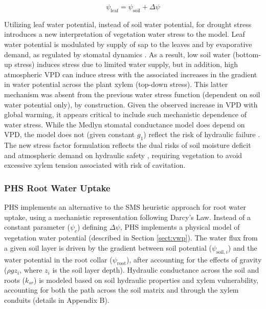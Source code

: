 \documentclass[draft,linenumbers]{agujournal}
\begin{document}
        \begin{linenomath*}
    \begin{equation}
\psi_{\text{leaf}} = \psi_{\text{soil}} + \Delta\psi
    \label{eq:fwphs}
    \end{equation}
    \end{linenomath*}
    
    Utilizing leaf water potential, instead of soil water potential, for drought stress introduces a new interpretation of vegetation water stress to the model. 
    Leaf water potential is modulated by supply of sap to the leaves and by evaporative demand, as regulated by stomatal dynamics \citep{novick2016a}. 
    As a result, low soil water (bottom-up stress) induces stress due to limited water supply, but in addition, high atmospheric VPD can induce stress with the associated increases in the gradient in water potential across the plant xylem (top-down stress). 
    This latter mechanism was absent from the previous water stress function (dependent on soil water potential only), by construction.
    Given the observed increase in VPD with global warming, it appears critical to include such mechanistic dependence of water stress.
    While the Medlyn stomatal conductance model does depend on VPD, the model does not (given constant $g_1$) reflect the risk of hydraulic failure \citep{zhou2013}.
    The new stress factor formulation reflects the dual risks of soil moisture deficit and atmospheric demand on hydraulic safety \citep{williams2013}, requiring vegetation to avoid excessive xylem tension associated with risk of cavitation.

    \subsubsection{PHS Root Water Uptake}
        \label{sect:phsrwu}
    
    PHS implements an alternative to the SMS heuristic approach for root water uptake, using a mechanistic representation following Darcy's Law.
    Instead of a constant parameter ($\psi_c$) defining $\Delta\psi$, PHS implements a physical model of vegetation water potential (described in Section \ref{sect:vwp}).
    The water flux from a given soil layer is driven by the gradient between soil potential ($\psi_{\text{soil},i}$) and the water potential in the root collar ($\psi_{\text{root}}$), 
    after accounting for the effects of gravity ($\rho g z_i$, where $z_i$ is the soil layer depth).
    Hydraulic conductance across the soil and roots ($k_{sr}$) is modeled based on soil hydraulic properties and xylem vulnerability, 
    accounting for both the path across the soil matrix and through the xylem conduits (details in Appendix B).
    
\end{document}
